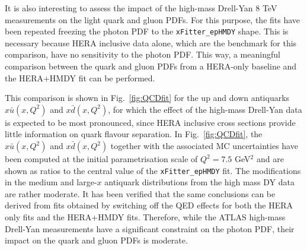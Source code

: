 It is also interesting to assess the impact of the high-mass Drell-Yan 8 TeV measurements on
the light quark and gluon PDFs.
%
For this purpose, the fits have been repeated freezing the photon PDF to the
{\tt xFitter\_epHMDY} shape. 
%
This is necessary because
HERA inclusive data alone, which are the 
benchmark for this comparison, have no sensitivity to the photon
PDF.
%
This way, 
a meaningful comparison between the quark and gluon PDFs
from a HERA-only
baseline and the HERA+HMDY fit can be performed.

This comparison is shown in Fig.~\ref{fig:QCDfit} for the up and down
antiquarks $x\bar{u}(x,Q^2)$ and $x\bar{d}(x,Q^2)$, for which the effect of the high-mass Drell-Yan data is
expected to be most pronounced, since HERA inclusive cross sections
provide little information on quark flavour separation.
%
In Fig.~\ref{fig:QCDfit}, the $x\bar{u}(x,Q^2)$ and $x\bar{d}(x,Q^2)$ together
with the associated MC uncertainties have been computed
at the initial parametrisation scale of $Q^2=7.5$ GeV$^2$ and
are shown as ratios to the central value of the {\tt xFitter\_epHMDY}
fit.
%
The modifications in the medium
and large-$x$ antiquark distributions from the high mass DY data are
rather moderate.
%
%
It has been verified that the same conclusions can be derived
from fits obtained by switching
off the QED effects for both the HERA only fits and the HERA+HMDY fits.
%
Therefore, while the ATLAS high-mass Drell-Yan measurements have a significant constraint
on the photon PDF, their impact on the quark and gluon PDFs is moderate.

